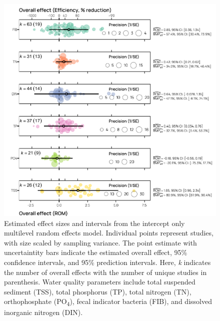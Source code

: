 \documentclass[utf8]{FrontiersinHarvard}
\begin{document}
\begin{figure}[p]
\includegraphics[width=1\linewidth,]{../figures/overall_effect} \caption{Estimated effect sizes and intervals from the intercept only multilevel random effects model. Individual points represent studies, with size scaled by sampling variance. The point estimate with uncertaintity bars indicate the estimated overall effect, 95\% confidence intervals, and 95\% prediction intervals. Here, \textit{k} indicates the number of overall effects with the number of unique studies in parenthesis. Water quality parameters include total suspended sediment (TSS), total phosphorus (TP), total nitrogen (TN), orthophosphate (PO\textsubscript{4}), fecal indicator bacteria (FIB), and dissolved inorganic nitrogen (DIN).}\label{fig:overalleffect}
\end{figure}
\end{document}
